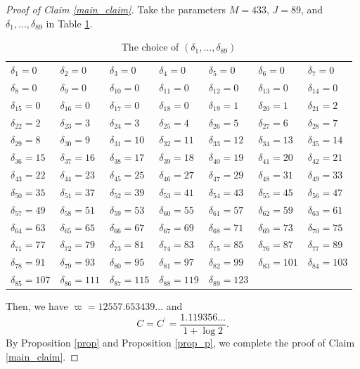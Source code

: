 \documentclass[12pt]{article}
\numberwithin{equation}{section}
\begin{document}
\begin{proof}[Proof of Claim \ref{main_claim}]
Take the parameters $M=433$, $J=89$, and $\delta_1,\ldots,\delta_{89}$ in Table \ref{table1}.
\begin{table}[htbp]
	\centering
	\caption{The choice of $(\delta_1,\ldots,\delta_{89})$}
	\label{table1}
	\begin{tabular}{|lllllll|}
	\hline
	$\delta_1=0$ & $\delta_2=0$ & $\delta_3=0$ & $\delta_4=0$ & $\delta_5=0$ & $\delta_6=0$ & $\delta_7=0$ \\
	$\delta_8=0$ & $\delta_9=0$ & $\delta_{10}=0$ & $\delta_{11}=0$ & $\delta_{12}=0$ & $\delta_{13}=0$ & $\delta_{14}=0$ \\
	$\delta_{15}=0$ & $\delta_{16}=0$ & $\delta_{17}=0$ & $\delta_{18}=0$ & $\delta_{19}=1$ & $\delta_{20}=1$ & $\delta_{21}=2$ \\
	$\delta_{22}=2$ & $\delta_{23}=3$ & $\delta_{24}=3$ & $\delta_{25}=4$ & $\delta_{26}=5$ & $\delta_{27}=6$ & $\delta_{28}=7$ \\
	$\delta_{29}=8$ & $\delta_{30}=9$ & $\delta_{31}=10$ & $\delta_{32}=11$ & $\delta_{33}=12$ & $\delta_{34}=13$ & $\delta_{35}=14$ \\
	$\delta_{36}=15$ & $\delta_{37}=16$ & $\delta_{38}=17$ & $\delta_{39}=18$ & $\delta_{40}=19$ & $\delta_{41}=20$ & $\delta_{42}=21$ \\
	$\delta_{43}=22$ & $\delta_{44}=23$ & $\delta_{45}=25$ & $\delta_{46}=27$ & $\delta_{47}=29$ & $\delta_{48}=31$ & $\delta_{49}=33$ \\
	$\delta_{50}=35$ & $\delta_{51}=37$ & $\delta_{52}=39$ & $\delta_{53}=41$ & $\delta_{54}=43$ & $\delta_{55}=45$ & $\delta_{56}=47$ \\
	$\delta_{57}=49$ & $\delta_{58}=51$ & $\delta_{59}=53$ & $\delta_{60}=55$ & $\delta_{61}=57$ & $\delta_{62}=59$ & $\delta_{63}=61$ \\
	$\delta_{64}=63$ & $\delta_{65}=65$ & $\delta_{66}=67$ & $\delta_{67}=69$ & $\delta_{68}=71$ & $\delta_{69}=73$ & $\delta_{70}=75$ \\
	$\delta_{71}=77$ & $\delta_{72}=79$ & $\delta_{73}=81$ & $\delta_{74}=83$ & $\delta_{75}=85$ & $\delta_{76}=87$ & $\delta_{77}=89$ \\
	$\delta_{78}=91$ & $\delta_{79}=93$ & $\delta_{80}=95$ & $\delta_{81}=97$ & $\delta_{82}=99$ & $\delta_{83}=101$ & $\delta_{84}=103$ \\
	$\delta_{85}=107$ & $\delta_{86}= 111$ & $\delta_{87}=115$ & $\delta_{88}=119$ & $\delta_{89}=123$ & & \\
	\hline
	\end{tabular}
\end{table}

Then, we have $\varpi = 12557.653439\ldots$ and 
\[ C=C^{\prime} = \frac{1.119356\ldots}{1+\log 2}. \]
By Proposition \ref{prop} and Proposition \ref{prop_p}, we complete the proof of Claim \ref{main_claim}.
\end{proof}
\end{document}
